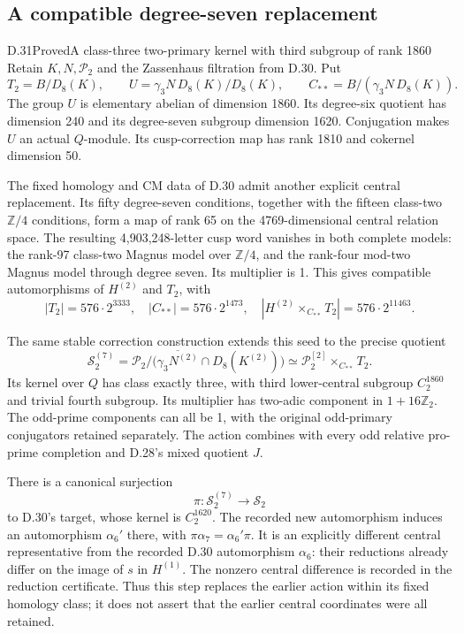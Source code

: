 \subsection{A compatible degree-seven replacement}

\begin{statement}{D.31}{Proved}{A class-three two-primary kernel with third subgroup of rank 1860}
Retain $K,N,\mathcal P_2$ and the Zassenhaus filtration
from D.30. Put
\[
 T_2=B/D_8(K),\qquad
 U=\gamma_3N\,D_8(K)/D_8(K),\qquad
 C_{**}=B/(\gamma_3N\,D_8(K)).                         \tag{D.31.1}
\]
The group $U$ is elementary abelian of dimension 1860.
Its degree-six quotient has dimension 240 and its
degree-seven subgroup dimension 1620. Conjugation
makes $U$ an actual $Q$-module. Its cusp-correction
map has rank 1810 and cokernel dimension 50.

The fixed homology and CM data of D.30 admit another
explicit central replacement. Its fifty degree-seven
conditions, together with the fifteen class-two
$\mathbb Z/4$ conditions, form a map of rank 65 on the
4769-dimensional central relation space. The resulting
4,903,248-letter cusp word vanishes in both complete
models: the rank-97 class-two Magnus model over
$\mathbb Z/4$, and the rank-four mod-two Magnus model
through degree seven. Its multiplier is 1. This gives
compatible automorphisms of $H^{(2)}$ and $T_2$, with
\[
 |T_2|=576\cdot2^{3333},\quad
 |C_{**}|=576\cdot2^{1473},\quad
 |H^{(2)}\times_{C_{**}}T_2|=576\cdot2^{11463}.
                                                               \tag{D.31.2}
\]

The same stable correction construction extends this
seed to the precise quotient
\[
 \mathcal S_2^{(7)}=
 \mathcal P_2/\bigl(
 \overline{\gamma_3N^{(2)}}\cap D_8(K^{(2)})\bigr)
 \simeq\mathcal P_2^{[2]}\times_{C_{**}}T_2.            \tag{D.31.3}
\]
Its kernel over $Q$ has class exactly three, with
third lower-central subgroup $C_2^{1860}$ and trivial
fourth subgroup. Its multiplier has two-adic component
in $1+16\mathbb Z_2$. The odd-prime components can all
be 1, with the original odd-primary conjugators retained
separately. The action combines with every odd relative
pro-prime completion and D.28's mixed quotient $J$.

There is a canonical surjection
\[
 \pi:\mathcal S_2^{(7)}\longrightarrow\mathcal S_2
                                                               \tag{D.31.4}
\]
to D.30's target, whose kernel is $C_2^{1620}$.
The recorded new automorphism induces an automorphism
$\alpha_6'$ there, with
$\pi\alpha_7=\alpha_6'\pi$.
It is an explicitly different central representative
from the recorded D.30 automorphism $\alpha_6$:
their reductions already differ on the image of $s$
in $H^{(1)}$. The nonzero central difference is
recorded in the reduction certificate. Thus this
step replaces the earlier action within its fixed
homology class; it does not assert that the earlier
central coordinates were all retained.


\end{statement}
